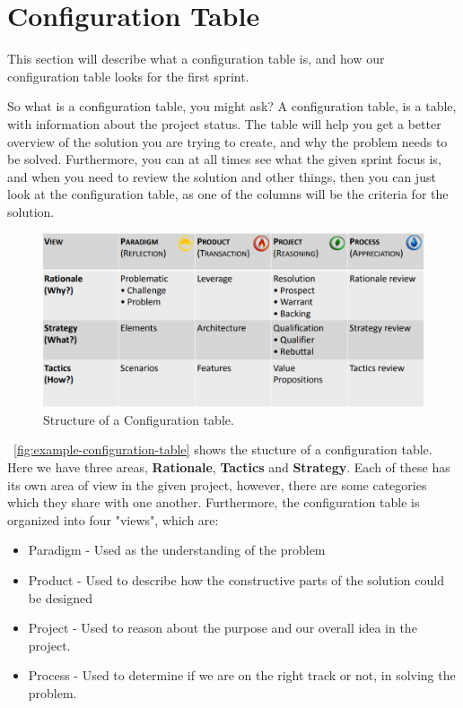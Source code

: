 \section{Configuration Table}\label{sec:first-configuration-table}
This section will describe what a configuration table is, and how our configuration table looks for the first sprint.

So what is a configuration table, you might ask?
A configuration table, is a table, with information about the project status. 
The table will help you get a better overview of the solution you are trying to create, and why the problem needs to be solved.
Furthermore, you can at all times see what the given sprint focus is, and when you need to review the solution and other things, then you can just look at the configuration table, as one of the columns will be the criteria for the solution.


\begin{figure}[h]
    \centering
    \includegraphics[width=\linewidth]{images/configurationTableExample.png}
    \caption{Structure of a Configuration table.}
    \label{fig:example-configuration-table}
\end{figure}

~\autoref{fig:example-configuration-table} shows the stucture of a configuration table.
Here we have three areas, \textbf{Rationale}, \textbf{Tactics} and \textbf{Strategy}.
Each of these has its own area of view in the given project, however, there are some categories which they share with one another.
Furthermore, the configuration table is organized into four "views", which are:

\begin{itemize}
    \item Paradigm - Used as the understanding of the problem
    \item Product - Used to describe how the constructive parts of the solution could be designed
    \item Project - Used to reason about the purpose and our overall idea in the project.
    \item Process - Used to determine if we are on the right track or not, in solving the problem. 
\end{itemize}

